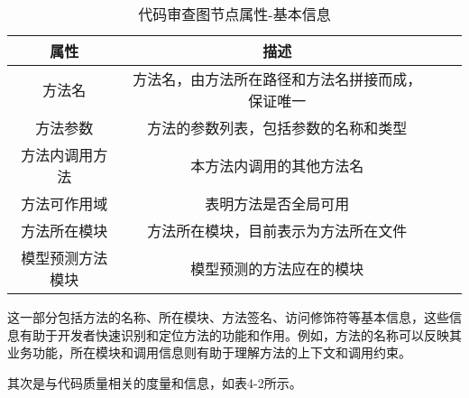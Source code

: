 \begin{table}[htbp]
\caption{代码审查图节点属性-基本信息}
\vspace{0.5em}\centering\wuhao
\begin{tabular}{cccc}
\toprule
    属性 & 描述 \\
\midrule
方法名 & 方法名，由方法所在路径和方法名拼接而成，保证唯一  \\
方法参数 & 方法的参数列表，包括参数的名称和类型   \\
方法内调用方法 & 本方法内调用的其他方法名   \\
方法可作用域 & 表明方法是否全局可用   \\
方法所在模块 &  方法所在模块，目前表示为方法所在文件  \\
模型预测方法模块 & 模型预测的方法应在的模块   \\     
\bottomrule
\end{tabular}
\end{table}

这一部分包括方法的名称、所在模块、方法签名、访问修饰符等基本信息，这些信息有助于开发者快速识别和定位方法的功能和作用。例如，方法的名称可以反映其业务功能，所在模块和调用信息则有助于理解方法的上下文和调用约束。

其次是与代码质量相关的度量和信息，如表4-2所示。

